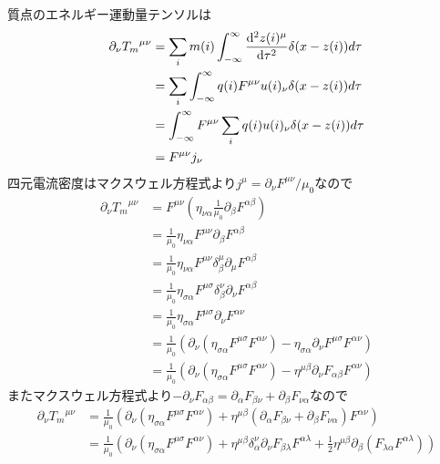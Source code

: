     質点のエネルギー運動量テンソルは
    \begin{align*}
        \partial_\nu {T_m}^{\mu\nu}
            &= \sum_i m(i) \int_{-\infty}^\infty \dv[2]{z(i)^\mu}{\tau}\delta(x - z(i)) d\tau\\
            &= \sum_i \int_{-\infty}^\infty q(i) F^{\mu\nu} u(i)_\nu \delta(x - z(i)) d\tau\\
            &= \int_{-\infty}^\infty F^{\mu\nu} \sum_i q(i)u(i)_\nu \delta(x - z(i)) d\tau\\
            &= F^{\mu\nu}j_\nu
    \end{align*}
    四元電流密度はマクスウェル方程式より$j^\mu = \partial_\nu F^{\mu\nu} / \mu_0$なので
    \begin{align*}
        \partial_\nu {T_m}^{\mu\nu}
            &= F^{\mu\nu} \left(\eta_{\nu\alpha} \frac{1}{\mu_0} \partial_\beta F^{\alpha\beta}\right)\\
            &= \frac{1}{\mu_0} \eta_{\nu\alpha} F^{\mu\nu} \partial_\beta F^{\alpha\beta}\\
            &= \frac{1}{\mu_0} \eta_{\nu\alpha} F^{\mu\nu} \delta_\beta^\mu \partial_\mu F^{\alpha\beta}\\
            &= \frac{1}{\mu_0} \eta_{\sigma\alpha} F^{\mu\sigma} \delta_\beta^\nu \partial_\nu F^{\alpha\beta}\\
            &= \frac{1}{\mu_0} \eta_{\sigma\alpha} F^{\mu\sigma} \partial_\nu F^{\alpha\nu}\\
            &= \frac{1}{\mu_0}(\partial_\nu(\eta_{\sigma\alpha} F^{\mu\sigma} F^{\alpha\nu}) - \eta_{\sigma\alpha}\partial_\nu F^{\mu\sigma} F^{\alpha\nu})\\
            &= \frac{1}{\mu_0}(\partial_\nu(\eta_{\sigma\alpha} F^{\mu\sigma} F^{\alpha\nu}) - \eta^{\mu\beta}\partial_\nu F_{\alpha\beta} F^{\alpha\nu})
    \end{align*}
    またマクスウェル方程式より$-\partial_\nu F_{\alpha\beta} = \partial_\alpha F_{\beta\nu} + \partial_\beta F_{\nu\alpha}$なので
    \begin{align*}
        \partial_\nu {T_m}^{\mu\nu}
            &= \frac{1}{\mu_0}(\partial_\nu(\eta_{\sigma\alpha} F^{\mu\sigma} F^{\alpha\nu}) + \eta^{\mu\beta}(\partial_\alpha F_{\beta\nu} + \partial_\beta F_{\nu\alpha})F^{\alpha\nu})\\
            &= \frac{1}{\mu_0}(\partial_\nu(\eta_{\sigma\alpha} F^{\mu\sigma} F^{\alpha\nu}) + \eta^{\mu\beta}\delta_\alpha^\nu \partial_\nu F_{\beta\lambda}F^{\alpha\lambda} + \frac{1}{2}\eta^{\mu\beta} \partial_\beta(F_{\lambda\alpha}F^{\alpha\lambda}))\\
    \end{align*}

